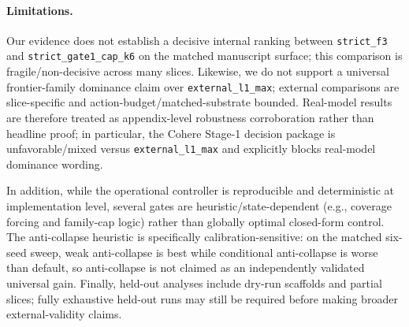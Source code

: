 \paragraph{Limitations.}
Our evidence does not establish a decisive internal ranking between \texttt{strict\_f3} and \texttt{strict\_gate1\_cap\_k6} on the matched manuscript surface; this comparison is fragile/non-decisive across many slices. Likewise, we do not support a universal frontier-family dominance claim over \texttt{external\_l1\_max}; external comparisons are slice-specific and action-budget/matched-substrate bounded. Real-model results are therefore treated as appendix-level robustness corroboration rather than headline proof; in particular, the Cohere Stage-1 decision package is unfavorable/mixed versus \texttt{external\_l1\_max} and explicitly blocks real-model dominance wording.

In addition, while the operational controller is reproducible and deterministic at implementation level, several gates are heuristic/state-dependent (e.g., coverage forcing and family-cap logic) rather than globally optimal closed-form control. The anti-collapse heuristic is specifically calibration-sensitive: on the matched six-seed sweep, weak anti-collapse is best while conditional anti-collapse is worse than default, so anti-collapse is not claimed as an independently validated universal gain. Finally, held-out analyses include dry-run scaffolds and partial slices; fully exhaustive held-out runs may still be required before making broader external-validity claims.
